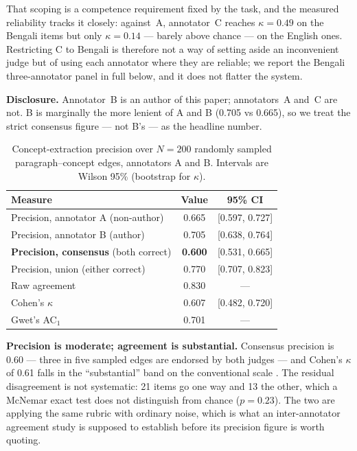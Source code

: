 \documentclass[pdflatex,sn-mathphys-num]{sn-jnl}
\begin{document}
That scoping is a competence requirement fixed by the task, and the
measured reliability tracks it closely: against~A, annotator~C reaches
$\kappa = 0.49$ on the Bengali items but only $\kappa = 0.14$ --- barely
above chance --- on the English ones. Restricting C to Bengali is
therefore not a way of setting aside an inconvenient judge but of using
each annotator where they are reliable; we report the Bengali
three-annotator panel in full below, and it does not flatter the system.

\textbf{Disclosure.} Annotator~B is an author of this paper; annotators~A
and~C are not. B is marginally the more lenient of A and B (0.705 vs
0.665), so we treat the strict consensus figure --- not B's --- as the
headline number.

\begin{table}[t]
\centering
\caption{Concept-extraction precision over $N=200$ randomly sampled
paragraph--concept edges, annotators A and B. Intervals are Wilson 95\%
(bootstrap for $\kappa$).}
\label{tab:precision}
\begin{tabular}{lcc}
\toprule
Measure & Value & 95\% CI\\
\midrule
Precision, annotator A (non-author)   & 0.665 & [0.597, 0.727]\\
Precision, annotator B (author)       & 0.705 & [0.638, 0.764]\\
\textbf{Precision, consensus} (both correct) & \textbf{0.600} & [0.531, 0.665]\\
Precision, union (either correct)     & 0.770 & [0.707, 0.823]\\
\midrule
Raw agreement                         & 0.830 & ---\\
Cohen's $\kappa$ \cite{cohen1960kappa} & 0.607 & [0.482, 0.720]\\
Gwet's AC$_1$ \cite{gwet2008ac1}       & 0.701 & ---\\
\bottomrule
\end{tabular}
\end{table}

\textbf{Precision is moderate; agreement is substantial.} Consensus
precision is 0.60 --- three in five sampled edges are endorsed by both
judges --- and Cohen's $\kappa$ of 0.61 falls in the ``substantial'' band
on the conventional scale \cite{landis1977kappa}. The residual
disagreement is not systematic: 21 items go one way and 13 the other,
which a McNemar exact test does not distinguish from chance
($p = 0.23$). The two are applying the same rubric with ordinary noise,
which is what an inter-annotator agreement study is supposed to establish
before its precision figure is worth quoting.
\end{document}
